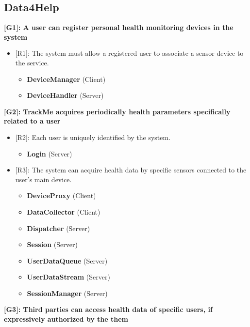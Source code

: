 {\color{Blue}\subsection{Data4Help}}
\raggedright
\textbf{[G1]: A user can register personal health monitoring devices in the system}
\begin{itemize}[partopsep=0.7 cm]
	\item {[R1]: The system must allow a registered user to associate a sensor device to the service.}
	\begin{itemize}
		\item {\textbf{DeviceManager} (Client)}
		\item {\textbf{DeviceHandler} (Server)}
	\end{itemize}
\end{itemize}
\textbf{[G2]: TrackMe acquires periodically health parameters specifically related to a user}
\begin{itemize}
	\item {[R2]: Each user is uniquely identified by the system.}
	\begin{itemize}
		\item {\textbf{Login} (Server)}
	\end{itemize}
	\item {[R3]: The system can acquire health data by specific sensors connected to the user's main device.}
	\begin{itemize}
		\item {\textbf{DeviceProxy} (Client)}
		\item {\textbf{DataCollector} (Client)}
		\item {\textbf{Dispatcher} (Server)}
		\item {\textbf{Session} (Server)}
		\item {\textbf{UserDataQueue} (Server)}
		\item {\textbf{UserDataStream} (Server)}
		\item {\textbf{SessionManager} (Server)}
	\end{itemize}
  
	
\end{itemize}
\textbf{[G3]: Third parties can access health data of specific users, if expressively authorized by the them}

